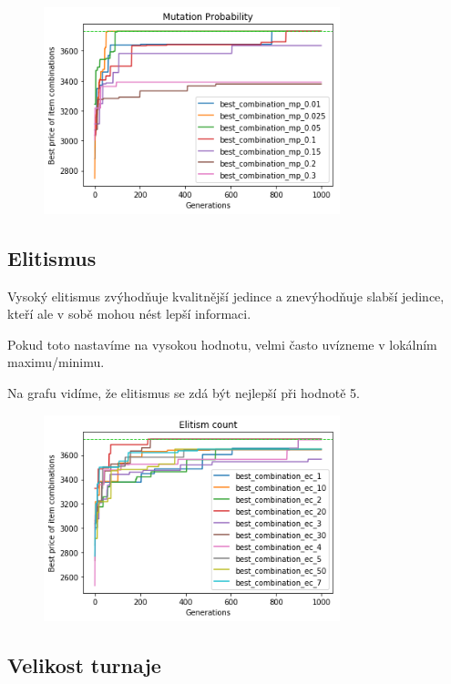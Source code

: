 \documentclass[a4paper,10pt,twocolumn]{article}
\begin{document}
\begin{itemize}
\begin{itemize}
\begin{figure}[H]
  \begin{center}
    \includegraphics[height=6cm]{graphs/mutation_probability.png}
  \end{center}
\end{figure}


\subsection{Elitismus}

Vysoký elitismus zvýhodňuje kvalitnější jedince a znevýhodňuje slabší jedince, kteří ale v sobě mohou nést lepší informaci.

Pokud toto nastavíme na vysokou hodnotu, velmi často uvízneme v lokálním maximu/minimu.

Na grafu vidíme, že elitismus se zdá být nejlepší při hodnotě 5.


\begin{figure}[H]
  \begin{center}
    \includegraphics[height=6cm]{graphs/elitism_count.png}
  \end{center}
\end{figure}


\subsection{Velikost turnaje}


\end{itemize}
\end{itemize}
\end{document}
